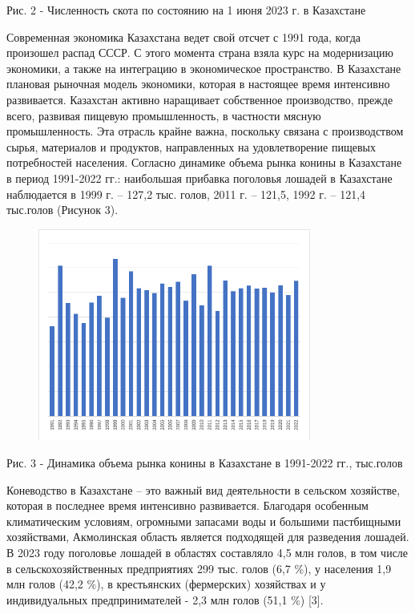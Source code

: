 Рис. 2 - Численность скота по состоянию на 1 июня 2023 г. в Казахстане

Современная экономика Казахстана ведет свой отсчет с 1991 года, когда
произошел распад СССР. С этого момента страна взяла курс на модернизацию
экономики, а также на интеграцию в экономическое пространство. В
Казахстане плановая рыночная модель экономики, которая в настоящее время
интенсивно развивается. Казахстан активно наращивает собственное
производство, прежде всего, развивая пищевую промышленность, в частности
мясную промышленность. Эта отрасль крайне важна, поскольку связана с
производством сырья, материалов и продуктов, направленных на
удовлетворение пищевых потребностей населения. Согласно динамике объема
рынка конины в Казахстане в период 1991-2022 гг.: наибольшая прибавка
поголовья лошадей в Казахстане наблюдается в 1999 г. -- 127,2 тыс.
голов, 2011 г. -- 121,5, 1992 г. -- 121,4 тыс.голов (Рисунок 3).

\begin{figure}[H]
	\centering
	\includegraphics[width=0.8\textwidth]{assets/308}
	\caption*{}
\end{figure}

Рис. 3 - Динамика объема рынка конины в Казахстане в 1991-2022 гг.,
тыс.голов

Коневодство в Казахстане -- это важный вид деятельности в сельском
хозяйстве, которая в последнее время интенсивно развивается. Благодаря
особенным климатическим условиям, огромными запасами воды и большими
пастбищными хозяйствами, Акмолинская область является подходящей для
разведения лошадей. В 2023 году поголовье лошадей в областях составляло
4,5 млн голов, в том числе в сельскохозяйственных предприятиях 299 тыс.
голов (6,7 \%), у населения 1,9 млн голов (42,2 \%), в крестьянских
(фермерских) хозяйствах и у индивидуальных предпринимателей - 2,3 млн
голов (51,1 \%) {[}3{]}.

